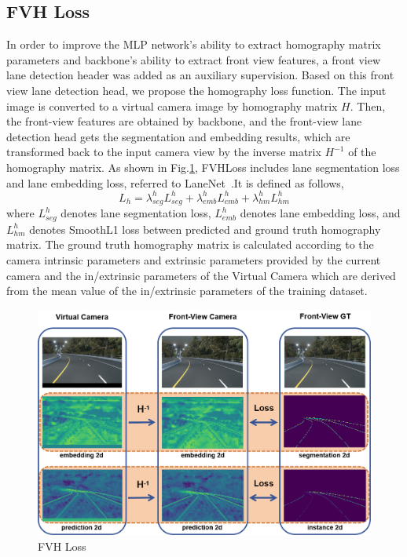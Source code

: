 \subsection{FVH Loss}
\label{subsec:FVH Loss}
In order to improve the MLP network's ability to extract homography matrix parameters and backbone's ability to extract front view features,
a front view lane detection header was added as an auxiliary supervision.
Based on this front view lane detection head, we propose the homography loss function.
The input image is converted to a virtual camera image by homography matrix $H$.
Then, the front-view features are obtained by backbone,
and the front-view lane detection head gets the segmentation and embedding results,
which are transformed back to the input camera view by the inverse matrix $H^{-1}$ of the homography matrix.
As shown in Fig.\ref{fig:FVH Loss Image}, FVHLoss includes lane segmentation loss and lane embedding loss,
referred to LaneNet~\cite{neven2018towards}.It is defined as follows,
\[
L_{h}=\lambda_{seg}^h L_{seg}^h + \lambda_{emb}^h L_{emb}^h + \lambda_{hm}^h L_{hm}^h
\]
where $L_{seg}^h$ denotes lane segmentation loss, $L_{emb}^h$ denotes lane embedding loss,
and $L_{hm}^h$ denotes SmoothL1 loss between predicted and ground truth homography matrix.
The ground truth homography matrix is calculated according to the camera intrinsic parameters and extrinsic parameters
provided by the current camera and the in/extrinsic parameters of the Virtual Camera which are derived from the mean value of the in/extrinsic
parameters of the training dataset.
\begin{figure}[htb]
    \centering
    \includegraphics[width=0.9\linewidth]{asset/loss4}
    \caption{FVH Loss}
    \label{fig:FVH Loss Image}
\end{figure}
